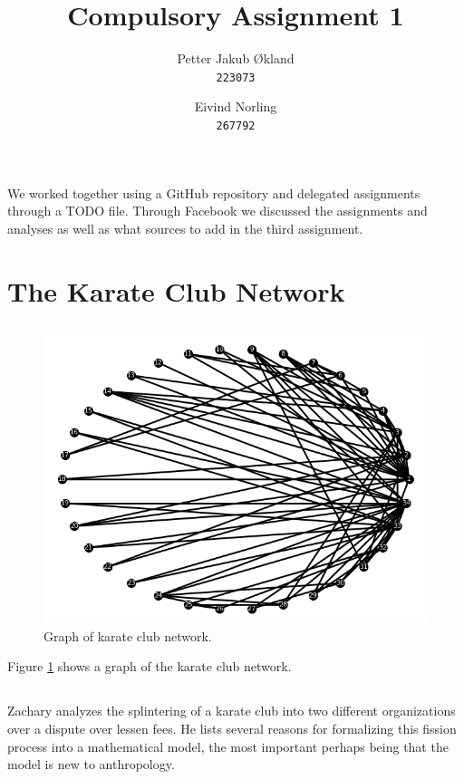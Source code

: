 \documentclass[11pt]{article}
\title{ Compulsory Assignment 1}
\author{
  Petter Jakub Økland\\
  \texttt{223073}
  \and
  Eivind Norling\\
  \texttt{267792}
}
\begin{document}
\maketitle

We worked together using a GitHub repository\cite{git} and delegated assignments through
a TODO file. Through Facebook we discussed the assignments and analyses as well as what
sources to add in the third assignment.

\section{The Karate Club Network}
\subsection{}
\begin{figure}
  \includegraphics[width=\linewidth]{Figure_1.png}
  \caption{Graph of karate club network.}
  \label{fig:graph model}
\end{figure}

Figure \ref{fig:graph model} shows a graph of the karate club network.

\subsection{}
Zachary\cite{Zachary} analyzes the splintering of a karate club into two different organizations
over a dispute over lessen fees. He lists several reasons for formalizing this fission
process into a mathematical model, the most important perhaps being that the model is
new to anthropology.
\end{document}
